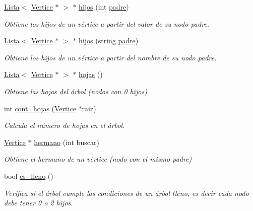 \begin{DoxyCompactItemize}
\hyperlink{classLista}{Lista}$<$ \hyperlink{classVertice}{Vertice} $\ast$ $>$ $\ast$ \hyperlink{classArbol_ac2bfb4e9bab05342fb7d627fe3916183}{hijos} (int \hyperlink{classArbol_abcb8c26e9021a1418de71ad6014351cf}{padre})
\begin{DoxyCompactList}\small\item\em Obtiene los hijos de un vértice a partir del valor de su nodo padre. \end{DoxyCompactList}\item 
\hyperlink{classLista}{Lista}$<$ \hyperlink{classVertice}{Vertice} $\ast$ $>$ $\ast$ \hyperlink{classArbol_ac799e737e25e07d285d2bb29ba950b5c}{hijos} (string \hyperlink{classArbol_abcb8c26e9021a1418de71ad6014351cf}{padre})
\begin{DoxyCompactList}\small\item\em Obtiene los hijos de un vértice a partir del nombre de su nodo padre. \end{DoxyCompactList}\item 
\hyperlink{classLista}{Lista}$<$ \hyperlink{classVertice}{Vertice} $\ast$ $>$ $\ast$ \hyperlink{classArbol_a54203315682d5c39015ae7d871223b66}{hojas} ()
\begin{DoxyCompactList}\small\item\em Obtiene las hojas del árbol (nodos con 0 hijos) \end{DoxyCompactList}\item 
int \hyperlink{classArbol_aba59969b2a10294fb79e583a8e9471c5}{cont\+\_\+hojas} (\hyperlink{classVertice}{Vertice} $\ast$raiz)
\begin{DoxyCompactList}\small\item\em Calcula el número de hojas en el árbol. \end{DoxyCompactList}\item 
\hyperlink{classVertice}{Vertice} $\ast$ \hyperlink{classArbol_a59ae16f1a68c5e5afd08be20dcbf5717}{hermano} (int buscar)
\begin{DoxyCompactList}\small\item\em Obtiene el hermano de un vértice (nodo con el mismo padre) \end{DoxyCompactList}\item 
bool \hyperlink{classArbol_a14ccdbb79a82bf19a24449acaea6c413}{es\+\_\+lleno} ()
\begin{DoxyCompactList}\small\item\em Verifica si el árbol cumple las condiciones de un árbol lleno, es decir cada nodo debe tener 0 o 2 hijos. \end{DoxyCompactList}\item 

\end{DoxyCompactItemize}
